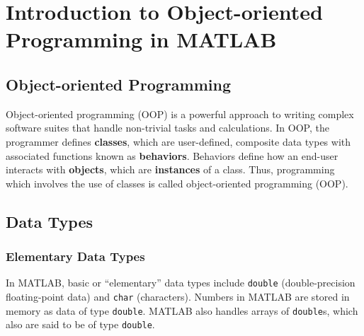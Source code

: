 \section{Introduction to Object-oriented Programming in MATLAB}

\subsection{Object-oriented Programming}

Object-oriented programming (OOP) is a powerful approach to writing complex software suites that handle non-trivial tasks and calculations. In OOP, the programmer defines \textbf{classes}, which are user-defined, composite data types with associated functions known as \textbf{behaviors}. Behaviors define how an end-user interacts with \textbf{objects}, which are \textbf{instances} of a class.  Thus, programming which involves the use of classes is called object-oriented programming (OOP).

\subsection{Data Types}

\subsubsection{Elementary Data Types}
In MATLAB, basic or ``elementary'' data types include \texttt{double} (double-precision floating-point data) and \texttt{char} (characters). Numbers in MATLAB are stored in memory as data of type \texttt{double}. MATLAB also handles arrays of \texttt{double}s, which also are said to be of type \texttt{double}.

